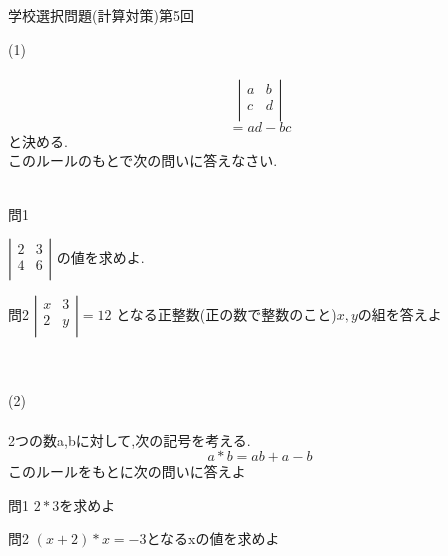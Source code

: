 \documentclass{jsarticle}
\begin{document}
\begin{center}
学校選択問題(計算対策)第5回
\end{center}
(1)
\\
\\
\[\left|
    \begin{array}{cc}
      a & b  \\
      c & d \\
    \end{array}
  \right|
\]
\[=ad-bc\]
と決める.
\\
このルールのもとで次の問いに答えなさい.
\\
\\
\begin{itembox}[l]{問1}

$\left| \begin{array}{cc}
    2 & 3 \\
    4 &  6 \\
\end{array}
\right|
$
の値を求めよ.
\end{itembox}
\begin{itembox}[l]{問2}
$\left| \begin{array}{cc}
    x & 3 \\
    2 & y \\
\end{array}
\right| =12
$
となる正整数(正の数で整数のこと)$x,y$の組を答えよ
\end{itembox}
\\
\\
(2)
\\
\\
2つの数a,bに対して,次の記号を考える.
\[a\ast b=ab+a-b\]
このルールをもとに次の問いに答えよ
\begin{itembox}[l]{問1}
$2 \ast 3$を求めよ
\end{itembox}
\begin{itembox}[l]{問2}
$(x+2)\ast x=-3$となるxの値を求めよ
\end{itembox}
\end{document}
